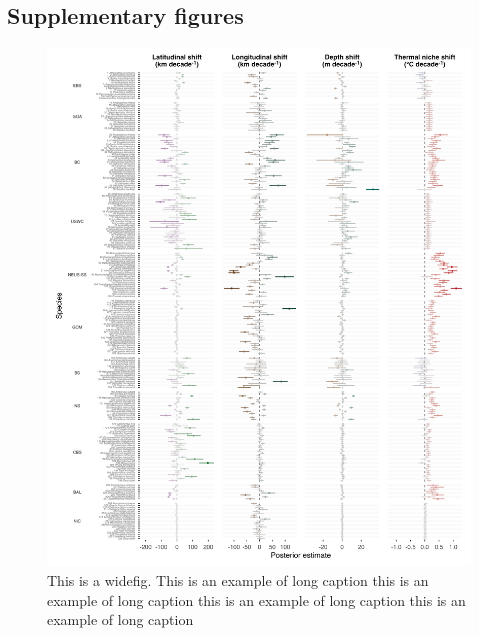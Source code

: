 \documentclass[lineno,pdflatex,sn-nature]{sn-jnl}%
\begin{document}
\begin{appendices}

\section{Supplementary figures}\label{Appendix A}

\begin{figure}[h]
\centering
\includegraphics[width=1\textwidth]{output/figures/supp/posterior_slopes_supp.png}
\caption{This is a widefig. This is an example of long caption this is an example of long caption  this is an example of long caption this is an example of long caption}\label{fig:posterior_slopes_supp}
\end{figure}


\end{appendices}
\end{document}
